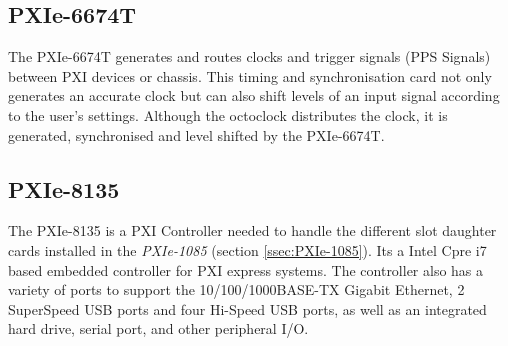 \subsection{PXIe-6674T}\label{ssec:PXIe-6674T}
The PXIe-6674T generates and routes clocks and trigger signals (PPS Signals) between PXI devices or chassis. This timing and synchronisation card not only generates an accurate clock but can also shift levels of an input signal according to the user's settings. Although the octoclock distributes the clock, it is generated, synchronised and level shifted by the PXIe-6674T.

\subsection{PXIe-8135}\label{ssec:PXIe-8135}
The PXIe-8135 is a PXI Controller needed to handle the different slot daughter cards installed in the \emph{PXIe-1085} (section \ref{ssec:PXIe-1085}). Its a Intel Cpre i7 based embedded controller for PXI express systems. The controller also has a variety of ports to support the 10/100/1000BASE-TX Gigabit Ethernet, 2 SuperSpeed USB ports and four Hi-Speed USB ports, as well as an integrated hard drive, serial port, and other peripheral I/O.

